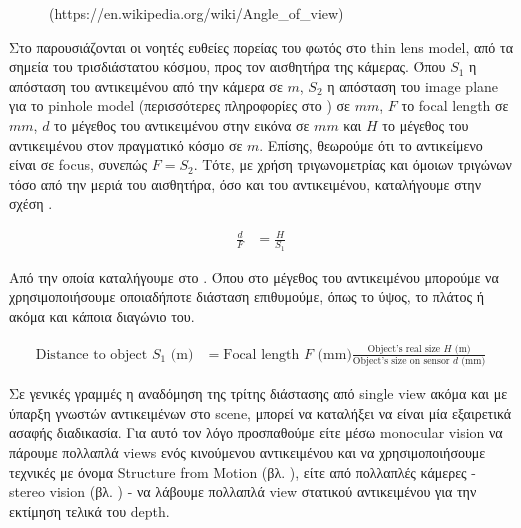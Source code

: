 \begin{figure} [H]
\begin{minipage}{.6\textwidth}
			\decoRule
			(https://en.wikipedia.org/wiki/Angle\_of\_view) 
			\label{fig:optical-axis-from-object-to-camera-sensor}
		\end{minipage}
\end{figure}

Στο  παρουσιάζονται οι νοητές ευθείες πορείας του φωτός στο thin lens model, από τα σημεία του τρισδιάστατου κόσμου, προς τον αισθητήρα της κάμερας. Όπου $S_1$ η απόσταση του αντικειμένου από την κάμερα σε $m$, $S_2$ η απόσταση του image plane για το pinhole model (περισσότερες πληροφορίες στο ) σε $mm$, $F$ το focal length σε $mm$, $d$ το μέγεθος του αντικειμένου στην εικόνα σε $mm$ και $H$ το μέγεθος του αντικειμένου στον πραγματικό κόσμο σε $m$. Επίσης, θεωρούμε ότι το αντικείμενο είναι σε focus, συνεπώς $F=S_2$. Τότε, με χρήση τριγωνομετρίας και όμοιων τριγώνων τόσο από την μεριά του αισθητήρα, όσο και του αντικειμένου, καταλήγουμε στην σχέση  \cite{calculate-distance-or-size-of-an-objectin-a-photo-image} \cite{calculate-distance-opencv} \cite{calculate-distance-stackexchange}.

\begin{align}
	\frac{d}{F} &= \frac{H}{S_1} \label{eq:distance-from-object-dim-triangles}
\end{align}

Από την οποία καταλήγουμε στο . Όπου στο μέγεθος του αντικειμένου μπορούμε να χρησιμοποιήσουμε οποιαδήποτε διάσταση επιθυμούμε, όπως το ύψος, το πλάτος ή ακόμα και κάποια διαγώνιο του.

\begin{align}
	\textrm{Distance to object $S_1$ (m)} &= \textrm{Focal length $F$ (mm)}\frac{\textrm{Object's real size $H$ (m)}}{\textrm{Object's size on sensor $d$ (mm)}} \label{eq:distance-from-object}
\end{align}

Σε γενικές γραμμές η αναδόμηση της τρίτης διάστασης από single view ακόμα και με ύπαρξη γνωστών αντικειμένων στο scene, μπορεί να καταλήξει να είναι μία εξαιρετικά ασαφής διαδικασία. Για αυτό τον λόγο προσπαθούμε είτε μέσω monocular vision να πάρουμε πολλαπλά views ενός κινούμενου αντικειμένου και να χρησιμοποιήσουμε τεχνικές με όνομα Structure from Motion (βλ. ), είτε από πολλαπλές κάμερες - stereo vision (βλ. ) - να λάβουμε πολλαπλά view στατικού αντικειμένου για την εκτίμηση τελικά του depth. 

